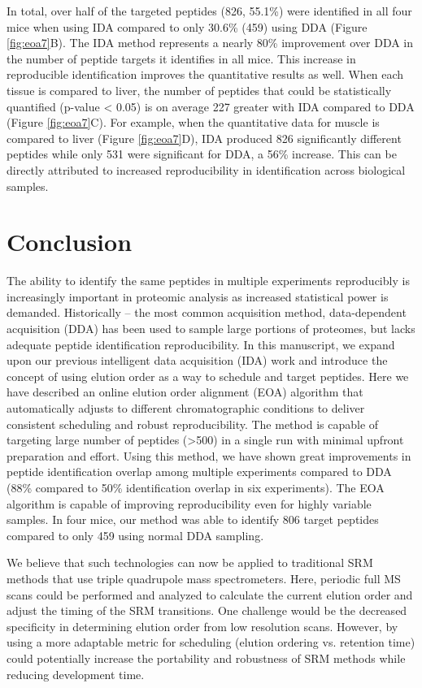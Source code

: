 In total, over half of the targeted peptides (826, 55.1\%) were identified in all four mice when using IDA compared to only 30.6\% (459) using DDA (Figure \ref{fig:eoa7}B). The IDA method represents a nearly 80\% improvement over DDA in the number of peptide targets it identifies in all mice. This increase in reproducible identification improves the quantitative results as well. When each tissue is compared to liver, the number of peptides that could be statistically quantified (p-value < 0.05) is on average 227 greater with IDA compared to DDA (Figure \ref{fig:eoa7}C). For example, when the quantitative data for muscle is compared to liver (Figure \ref{fig:eoa7}D), IDA produced 826 significantly different peptides while only 531 were significant for DDA, a 56\% increase. This can be directly attributed to increased reproducibility in identification across biological samples.

\section{Conclusion}

The ability to identify the same peptides in multiple experiments reproducibly is increasingly important in proteomic analysis as increased statistical power is demanded. Historically -- the most common acquisition method, data-dependent acquisition (DDA) has been used to sample large portions of proteomes, but lacks adequate peptide identification reproducibility. In this manuscript, we expand upon our previous intelligent data acquisition (IDA) work and introduce the concept of using elution order as a way to schedule and target peptides.  Here we have described an online elution order alignment (EOA) algorithm that automatically adjusts to different chromatographic conditions to deliver consistent scheduling and robust reproducibility. The method is capable of targeting large number of peptides (>500) in a single run with minimal upfront preparation and effort. Using this method, we have shown great improvements in peptide identification overlap among multiple experiments compared to DDA (88\% compared to 50\% identification overlap in six experiments). The EOA algorithm is capable of improving reproducibility even for highly variable samples. In four mice, our method was able to identify 806 target peptides compared to only 459 using normal DDA sampling. 

We believe that such technologies can now be applied to traditional SRM methods that use triple quadrupole mass spectrometers. Here, periodic full MS scans could be performed and analyzed to calculate the current elution order and adjust the timing of the SRM transitions. One challenge would be the decreased specificity in determining elution order from low resolution scans. However, by using a more adaptable metric for scheduling (elution ordering vs. retention time) could potentially increase the portability and robustness of SRM methods while reducing development time. 

